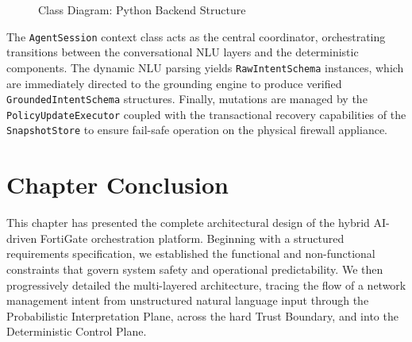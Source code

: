 \begin{figure}[H]
    \caption{Class Diagram: Python Backend Structure}
    \label{fig:uml_class_diagram}
\end{figure}

The \texttt{AgentSession} context class acts as the central coordinator, orchestrating transitions between the conversational NLU layers and the deterministic components. The dynamic NLU parsing yields \texttt{RawIntentSchema} instances, which are immediately directed to the grounding engine to produce verified \texttt{GroundedIntentSchema} structures. Finally, mutations are managed by the \texttt{PolicyUpdateExecutor} coupled with the transactional recovery capabilities of the \texttt{SnapshotStore} to ensure fail-safe operation on the physical firewall appliance.

\section{Chapter Conclusion}
This chapter has presented the complete architectural design of the hybrid AI-driven FortiGate orchestration platform. Beginning with a structured requirements specification, we established the functional and non-functional constraints that govern system safety and operational predictability. We then progressively detailed the multi-layered architecture, tracing the flow of a network management intent from unstructured natural language input through the Probabilistic Interpretation Plane, across the hard Trust Boundary, and into the Deterministic Control Plane.

